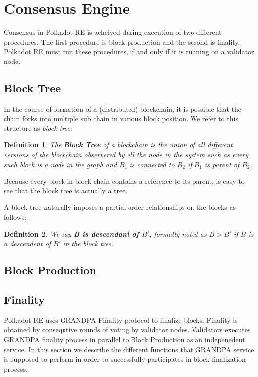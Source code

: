 \documentclass{article}
\newcommand{\tmem}[1]{{\em #1\/}}
\newcommand{\tmstrong}[1]{\textbf{#1}}
\newcommand{\tmtextbf}[1]{{\bfseries{#1}}}
\newcommand{\tmtextit}[1]{{\itshape{#1}}}
\newtheorem{definition}{Definition}
\providecommand{\tmem}[1]{\tmtextit{#1}}
\providecommand{\tmstrong}[1]{\tmtextbf{#1}}
\providecommand{\tmtextbf}[1]{\tmtextbf{#1}}
\providecommand{\tmtextit}[1]{\tmtextit{#1}}
\newtheorem{definition}{Definition}
\begin{document}
\section{Consensus Engine}

Consensus in Polkadot RE is acheived during execution of two different
procedures. The first procedure is block production and the second is
finality. Polkadot RE must run these procedures, if and only if it is running
on a validator node.

\subsection{Block Tree}

In the course of formation of a (distributed) blockchain, it is possible that
the chain forks into multiple sub chain in various block position. We refer to
this structure as {\tmem{block tree:}}

\begin{definition}
  The {\tmstrong{Block Tree}} of a blockchain is the union of all different
  versions of the blockchain observered by all the node in the system such as
  every such block is a node in the graph and $B_1$ is connected to $B_2$ if
  $B_1$ is parent of $B_2$.
\end{definition}

Because every block in block chain contains a reference to its parent, is easy
to see that the block tree is actually a tree.

A block tree naturally imposes a partial order relationships on the blocks as
follows:

\begin{definition}
  We say {\tmstrong{B is descendant of $B'$}}, formally noted as {\tmstrong{$B
  > B'$}} if $B$ is a descendent of $B'$ in the block tree.
\end{definition}

\subsection{Block Production}

\subsection{Finality}

Polkadot RE uses GRANDPA Finality protocol {\cite{AlSt19-Grandpa}} to finalize
blocks. Finality is obtained by consequtive rounds of voting by validator
nodes. Validators executes GRANDPA finality process in parallel to Block
Production as an indepenedent service. In this section we describe the
different functions that GRANDPA service is supposed to perform in order to
successfully participates in block finalization process.
\end{document}
